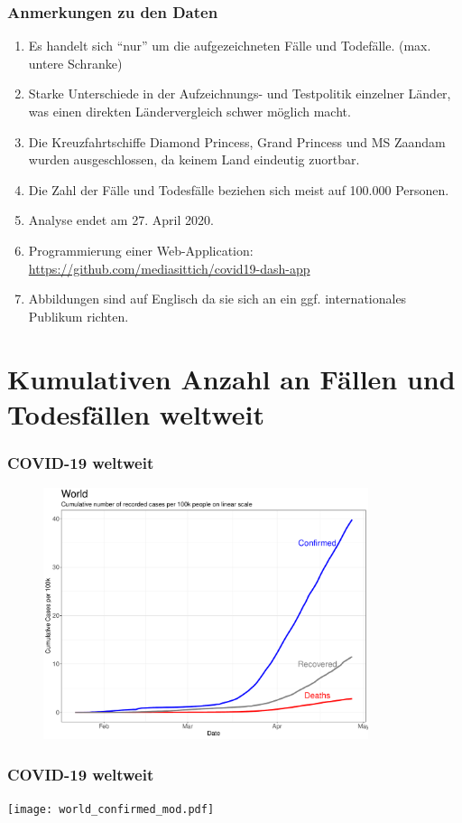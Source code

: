 \documentclass{beamer}
\begin{document}
 \begin{frame}
 	\frametitle{Anmerkungen zu den Daten}
 	\begin{enumerate}
 		\item Es handelt sich ``nur'' um die aufgezeichneten Fälle und Todefälle. (max. untere Schranke)
 		\item Starke Unterschiede in der Aufzeichnungs- und Testpolitik einzelner Länder, was einen direkten Ländervergleich schwer möglich macht. 
 		\item Die Kreuzfahrtschiffe Diamond Princess, Grand Princess und MS Zaandam wurden ausgeschlossen, da keinem Land eindeutig zuortbar. 
 		\item Die Zahl der Fälle und Todesfälle beziehen sich meist auf 100.000 Personen.
 		\item Analyse endet am 27. April 2020.
 		\pause
 		\item Programmierung einer Web-Application: \url{https://github.com/mediasittich/covid19-dash-app}
 		\item Abbildungen sind auf Englisch da sie sich an ein ggf. internationales Publikum richten.
 	\end{enumerate}
 \end{frame}
 
 \section{Kumulativen Anzahl an Fällen und Todesfällen weltweit}
 \begin{frame}
 	\frametitle{COVID-19 weltweit}
	\begin{figure}
		\centering
		\includegraphics[width = 270pt]{Cases_world.pdf}
	\end{figure}
 \end{frame}

 \begin{frame}
 	\frametitle{COVID-19 weltweit}
		\centering
		\texttt{[image: world\_confirmed\_mod.pdf]}
 \end{frame}
\end{document}
